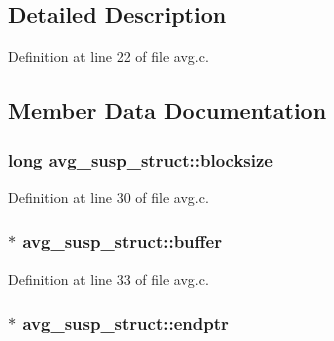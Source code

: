 \subsection{Detailed Description}


Definition at line 22 of file avg.\+c.



\subsection{Member Data Documentation}
\subsubsection[{\texorpdfstring{blocksize}{blocksize}}]{\setlength{\rightskip}{0pt plus 5cm}long avg\+\_\+susp\+\_\+struct\+::blocksize}\hypertarget{structavg__susp__struct_a58a62041a7b7aecfadd778e0b50312fa}{}\label{structavg__susp__struct_a58a62041a7b7aecfadd778e0b50312fa}


Definition at line 30 of file avg.\+c.

\subsubsection[{\texorpdfstring{buffer}{buffer}}]{$\ast$ avg\+\_\+susp\+\_\+struct\+::buffer}\hypertarget{structavg__susp__struct_a6f0efa0e5bf554a78b8eb4b01d1e3ae4}{}\label{structavg__susp__struct_a6f0efa0e5bf554a78b8eb4b01d1e3ae4}


Definition at line 33 of file avg.\+c.

\subsubsection[{\texorpdfstring{endptr}{endptr}}]{$\ast$ avg\+\_\+susp\+\_\+struct\+::endptr}\hypertarget{structavg__susp__struct_a730f0d051b7ec1a7deae25e96f4d2aae}{}\label{structavg__susp__struct_a730f0d051b7ec1a7deae25e96f4d2aae}


